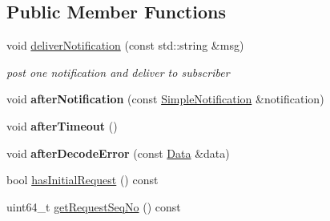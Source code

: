 \subsection*{Public Member Functions}
\begin{DoxyCompactItemize}
\item 
void \hyperlink{classndn_1_1util_1_1tests_1_1EndToEndFixture_a36a9dfe46c7672821e80d998c0fd06f3}{deliver\+Notification} (const std\+::string \&msg)\hypertarget{classndn_1_1util_1_1tests_1_1EndToEndFixture_a36a9dfe46c7672821e80d998c0fd06f3}{}\label{classndn_1_1util_1_1tests_1_1EndToEndFixture_a36a9dfe46c7672821e80d998c0fd06f3}

\begin{DoxyCompactList}\small\item\em post one notification and deliver to subscriber \end{DoxyCompactList}\item 
void {\bfseries after\+Notification} (const \hyperlink{classndn_1_1util_1_1tests_1_1SimpleNotification}{Simple\+Notification} \&notification)\hypertarget{classndn_1_1util_1_1tests_1_1EndToEndFixture_ab744c0b2a19663e3220d9a03d7f14d38}{}\label{classndn_1_1util_1_1tests_1_1EndToEndFixture_ab744c0b2a19663e3220d9a03d7f14d38}

\item 
void {\bfseries after\+Timeout} ()\hypertarget{classndn_1_1util_1_1tests_1_1EndToEndFixture_aeb52097a9170045eeeccd8b0a23417b9}{}\label{classndn_1_1util_1_1tests_1_1EndToEndFixture_aeb52097a9170045eeeccd8b0a23417b9}

\item 
void {\bfseries after\+Decode\+Error} (const \hyperlink{classndn_1_1Data}{Data} \&data)\hypertarget{classndn_1_1util_1_1tests_1_1EndToEndFixture_a76b1da7e6eacbaf7d4dfcb85794fcf15}{}\label{classndn_1_1util_1_1tests_1_1EndToEndFixture_a76b1da7e6eacbaf7d4dfcb85794fcf15}

\item 
bool \hyperlink{classndn_1_1util_1_1tests_1_1EndToEndFixture_ac0595a8aa7308f75d77485b4027cc374}{has\+Initial\+Request} () const
\item 
uint64\+\_\+t \hyperlink{classndn_1_1util_1_1tests_1_1EndToEndFixture_add9135f58c1e90e2ba4b0dd99c2935f2}{get\+Request\+Seq\+No} () const
\end{DoxyCompactItemize}
